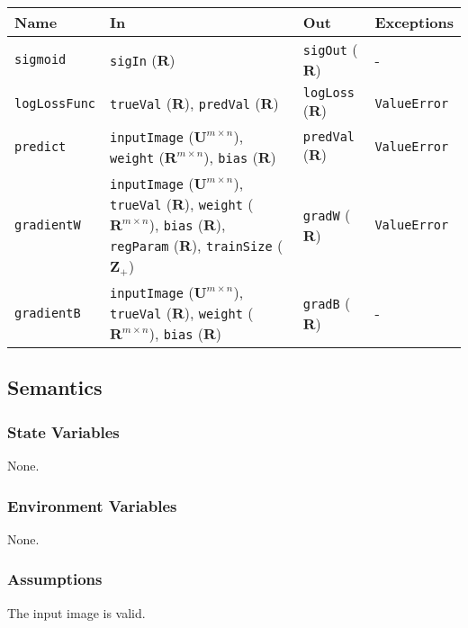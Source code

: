 \documentclass[12pt, titlepage]{article}
\def\code#1{\texttt{#1}}
\begin{document}
\begin{center}
\begin{tabular}{p{3cm} p{5cm} p{3cm} p{1cm}}
\hline
\textbf{Name} & \textbf{In} & \textbf{Out} & \textbf{Exceptions} \\
\hline
\code{sigmoid} & \code{sigIn} ($\mathbf{R}$) & \code{sigOut} ($\mathbf{R}$) & - \\
\code{logLossFunc} & \code{trueVal} ($\mathbf{R}$), \code{predVal} ($\mathbf{R}$) & \code{logLoss} ($\mathbf{R}$) & \code{ValueError} \\
\code{predict} & \code{inputImage} ($\mathbf{U}^{m \times n}$), \code{weight} ($\mathbf{R}^{m \times n}$), \code{bias} ($\mathbf{R}$) & \code{predVal} ($\mathbf{R}$) & \code{ValueError} \\
\code{gradientW} & \code{inputImage} ($\mathbf{U}^{m \times n}$), \code{trueVal} ($\mathbf{R}$), \code{weight} ($\mathbf{R}^{m \times n}$), \code{bias} ($\mathbf{R}$), \code{regParam} ($\mathbf{R}$), \code{trainSize} ($\mathbf{Z}_{+}$)& \code{gradW} ($\mathbf{R}$) & \code{ValueError} \\
\code{gradientB} & \code{inputImage} ($\mathbf{U}^{m \times n}$), \code{trueVal} ($\mathbf{R}$), \code{weight} ($\mathbf{R}^{m \times n}$), \code{bias} ($\mathbf{R}$)& \code{gradB} ($\mathbf{R}$) & - \\
\hline
\end{tabular}
\end{center}

\subsection{Semantics}

\subsubsection{State Variables}

None.

\subsubsection{Environment Variables}

None.

\subsubsection{Assumptions}

The input image is valid.
\end{document}
